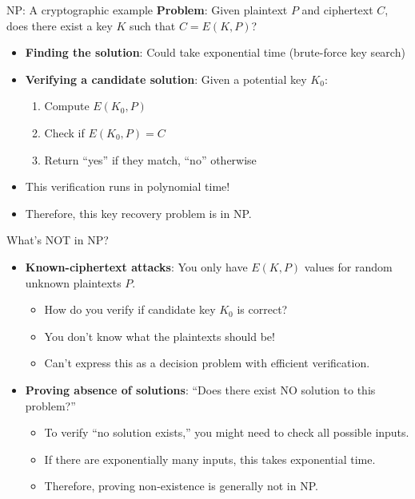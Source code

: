 \documentclass[aspectratio=169, lualatex, handout]{beamer}
\begin{document}
\begin{frame}{NP: A cryptographic example}
	\textbf{Problem}: Given plaintext $P$ and ciphertext $C$, does there exist a key $K$ such that $C = E(K, P)$?
	\begin{itemize}[<+->]
		\item \textbf{Finding the solution}: Could take exponential time (brute-force key search)
		\item \textbf{Verifying a candidate solution}: Given a potential key $K_0$:
		      \begin{enumerate}
			      \item Compute $E(K_0, P)$
			      \item Check if $E(K_0, P) = C$
			      \item Return ``yes'' if they match, ``no'' otherwise
		      \end{enumerate}
		\item This verification runs in polynomial time!
		\item Therefore, this key recovery problem is in NP.
	\end{itemize}
\end{frame}

\begin{frame}{What's NOT in NP?}
	\begin{itemize}[<+->]
		\item \textbf{Known-ciphertext attacks}: You only have $E(K, P)$ values for random unknown plaintexts $P$.
		      \begin{itemize}
			      \item How do you verify if candidate key $K_0$ is correct?
			      \item You don't know what the plaintexts should be!
			      \item Can't express this as a decision problem with efficient verification.
		      \end{itemize}
		\item \textbf{Proving absence of solutions}: ``Does there exist NO solution to this problem?''
		      \begin{itemize}
			      \item To verify ``no solution exists,'' you might need to check all possible inputs.
			      \item If there are exponentially many inputs, this takes exponential time.
			      \item Therefore, proving non-existence is generally not in NP.
		      \end{itemize}
	\end{itemize}
\end{frame}
\end{document}
